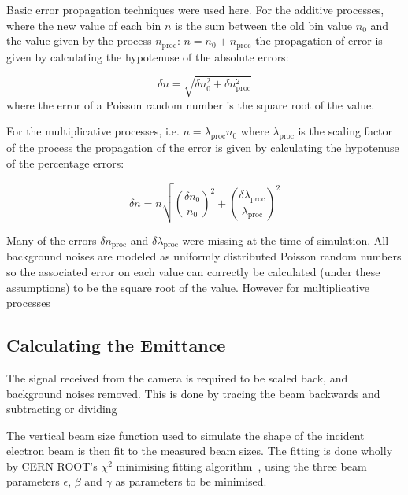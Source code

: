 Basic error propagation techniques were used here. For the additive processes,
where the new value of each bin $n$ is the sum between the old bin value $n_0$
and the value given by the process $n_\text{proc}$: $n=n_0+n_\text{proc}$ the
propagation of error is given by calculating the hypotenuse of the absolute
errors:

\begin{equation}
	\delta n= \sqrt{\delta n_0^2 + \delta n_\text{proc}^2}
\end{equation}
%
where the error of a Poisson random number is the square root of the value.

For the multiplicative processes, i.e. $n = \lambda_\text{proc}n_0 $ where
$\lambda_\text{proc}$ is the scaling factor of the process the propagation of
the error is given by calculating the hypotenuse of the percentage errors:

\begin{equation}
	\delta n= n \sqrt{
		\left( \frac{\delta n_0}{n_0} \right)^2 +
		\left( \frac{\delta \lambda_\text{proc}}{\lambda_\text{proc}} \right)^2}
\end{equation}

Many of the errors \(\delta n_\text{proc}\) and \(\delta \lambda_\text{proc}\)
were missing at the time of simulation. All background noises are modeled as
uniformly distributed Poisson random numbers so the associated error on each
value can correctly be calculated (under these assumptions) to be the square
root of the value. %
However for multiplicative processes %



\subsection{Calculating the Emittance}

The signal received from the camera is required to be scaled back, and
background noises removed. This is done by tracing the beam backwards and
subtracting or dividing %

The vertical beam size function used to simulate the shape of the incident
electron beam is then fit to the measured beam sizes. The fitting is done wholly
by CERN ROOT's \(\chi^2\) minimising fitting algorithm~\cite{Brun:1997pa}, using
the three beam parameters \(\epsilon\), \(\beta\) and \(\gamma\) as parameters
to be minimised.

